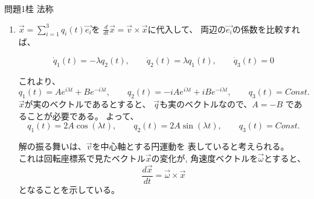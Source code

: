 \documentclass[fleqn]{jbook}
\begin{document}
\begin{answer}{問題1}{桂  法称}
\begin{enumerate}
$\overrightarrow{x}=U\overrightarrow{q}$より、
$\overrightarrow{q}=U^{-1} \overrightarrow{x}$
(なぜならば$U$は実直行行列)\\
これを前の式に代入すれば、
$\overrightarrow{v} \times \overrightarrow{x} = U \left(
      \begin{array}{ccc}
        0 & -\lambda & 0 \\
        \lambda  & 0 & 0 \\
        0 & 0 & 0        \\
      \end{array} \right)  U^t \overrightarrow{x}$\\
(1)で書き換えた関係から、$A$は上の
$U \left(
      \begin{array}{ccc}
        0 & -\lambda & 0 \\
        \lambda  & 0 & 0 \\
        0 & 0 & 0        \\
      \end{array} \right)  U^t$
であることが分かる。\\
また、$U = \left(
      \begin{array}{ccc}
        0 & \frac{1}{\sqrt 3}& \frac{2}{\sqrt 6}\\
        \frac{1}{\sqrt 2}& -\frac{1}{\sqrt 3}& \frac{1}{\sqrt 6}\\
        \frac{1}{\sqrt 2} & \frac{1}{\sqrt 3}& -\frac{1}{\sqrt 6}\\
      \end{array} \right)$
\item
$\overrightarrow{x} =
      \sum_{i=1} ^3 q_i(t) \overrightarrow{e_i}$を
$\frac{d}{dt}\overrightarrow{x}=
      \overrightarrow{v} \times \overrightarrow{x}$に代入して、
両辺の$\overrightarrow{e_i}$の係数を比較すれば、

$$\dot q_1(t) = -\lambda q_2(t), \qquad
  \dot q_2(t) = \lambda q_1(t), \qquad
  \dot q_3(t) = 0$$

これより、\\
$$q_1(t) = Ae^{i \lambda t} + B e^{-i \lambda t}, \qquad
  q_2(t) = -iAe^{i \lambda t} + iB e^{-i \lambda t}, \qquad
  q_3(t) = Const.$$
$\overrightarrow{x}$が実のベクトルであるとすると、
$\overrightarrow{q}$も実のベクトルなので、$A=-B$
であることが必要である。
よって、
$$q_1(t) = 2A \cos(\lambda t), \qquad
  q_2(t) = 2A \sin(\lambda t), \qquad
  q_3(t) = Const.$$

解の振る舞いは、$\overrightarrow{v}$を中心軸とする円運動を
表していると考えられる。\\
これは回転座標系で見たベクトル$\overrightarrow{x}$の変化が,
角速度ベクトルを$\overrightarrow{\omega}$とすると、\\
$$\frac{d \overrightarrow{x}}{dt} = 
\overrightarrow{\omega} \times \overrightarrow{x}$$
となることを示している。
\end{enumerate}
\end{answer}
\end{document}
